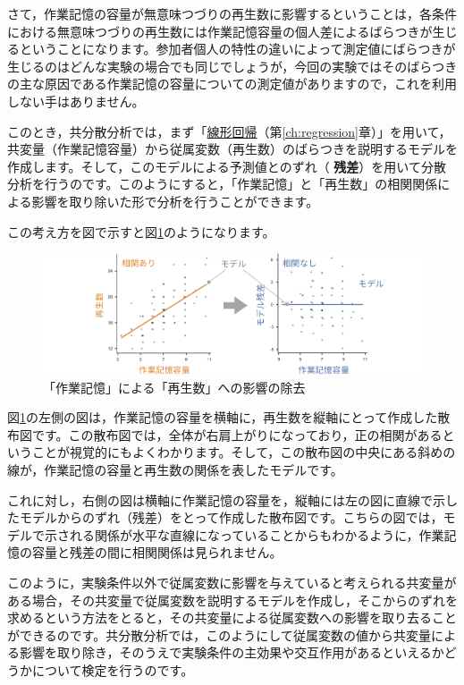 \documentclass[
  12pt,
  a5jpaper,
  lualatex, ja=standard]{bxjsbook}
\renewcommand{\emph}[1]{\textbf{\color{emph} #1}}
\begin{document}
さて，作業記憶の容量が無意味つづりの再生数に影響するということは，各条件における無意味つづりの再生数には作業記憶容量の個人差によるばらつきが生じるということになります。参加者個人の特性の違いによって測定値にばらつきが生じるのはどんな実験の場合でも同じでしょうが，今回の実験ではそのばらつきの主な原因である作業記憶の容量についての測定値がありますので，これを利用しない手はありません。

このとき，共分散分析では，まず「\protect\hyperlink{sec:regression-LR}{線形回帰}（第\ref{ch:regression}章）」を用いて，共変量（作業記憶容量）から従属変数（再生数）のばらつきを説明するモデルを作成します。そして，このモデルによる予測値とのずれ（\emph{残差}）を用いて分散分析を行うのです。このようにすると，「作業記憶」と「再生数」の相関関係による影響を取り除いた形で分析を行うことができます。

この考え方を図で示すと図\ref{fig:ANOVA-ancova-residual-plot}のようになります。

\begin{figure}[!ht]

{\centering \includegraphics[width=1\linewidth]{images/ANOVA/ancova-residual-plot} 

}

\caption{「作業記憶」による「再生数」への影響の除去}\label{fig:ANOVA-ancova-residual-plot}
\end{figure}

図\ref{fig:ANOVA-ancova-residual-plot}の左側の図は，作業記憶の容量を横軸に，再生数を縦軸にとって作成した散布図です。この散布図では，全体が右肩上がりになっており，正の相関があるということが視覚的にもよくわかります。そして，この散布図の中央にある斜めの線が，作業記憶の容量と再生数の関係を表したモデルです。

これに対し，右側の図は横軸に作業記憶の容量を，縦軸には左の図に直線で示したモデルからのずれ（残差）をとって作成した散布図です。こちらの図では，モデルで示される関係が水平な直線になっていることからもわかるように，作業記憶の容量と残差の間に相関関係は見られません。

このように，実験条件以外で従属変数に影響を与えていると考えられる共変量がある場合，その共変量で従属変数を説明するモデルを作成し，そこからのずれを求めるという方法をとると，その共変量による従属変数への影響を取り去ることができるのです。共分散分析では，このようにして従属変数の値から共変量による影響を取り除き，そのうえで実験条件の主効果や交互作用があるといえるかどうかについて検定を行うのです。
\end{document}
